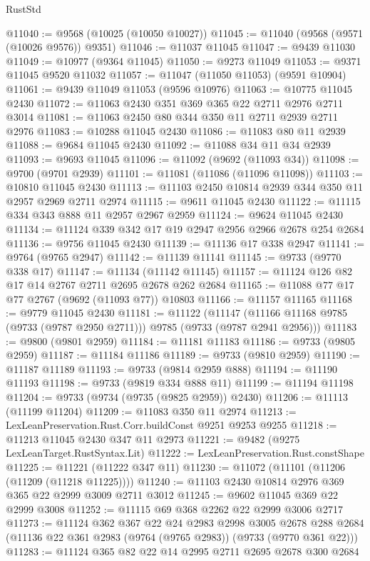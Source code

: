 \begin{lexlean}{RustStd}
\begin{coremodule}
{\begin{coremodule}
{{{{{{{{{{{{{{{{{{{{{{{{{{{{{{{{{{{{{{{{{{{{{{{{{{{{{{{@11040 := @9568 (@10025 (@10050 @10027))
@11045 := @11040 (@9568 (@9571 (@10026 @9576)) @9351)
@11046 := @11037 @11045
@11047 := @9439 @11030
@11049 := @10977 (@9364 @11045)
@11050 := @9273 @11049
@11053 := @9371 @11045 @9520 @11032
@11057 := @11047 (@11050 @11053) (@9591 @10904)
@11061 := @9439 @11049 @11053 (@9596 @10976)
@11063 := @10775 @11045 @2430
@11072 := @11063 @2430 @351 @369 @365 @22 @2711 @2976 @2711 @3014
@11081 := @11063 @2450 @80 @344 @350 @11 @2711 @2939 @2711 @2976
@11083 := @10288 @11045 @2430
@11086 := @11083 @80 @11 @2939
@11088 := @9684 @11045 @2430
@11092 := @11088 @34 @11 @34 @2939
@11093 := @9693 @11045
@11096 := @11092 (@9692 (@11093 @34))
@11098 := @9700 (@9701 @2939)
@11101 := @11081 (@11086 (@11096 @11098))
@11103 := @10810 @11045 @2430
@11113 := @11103 @2450 @10814 @2939 @344 @350 @11 @2957 @2969 @2711 @2974
@11115 := @9611 @11045 @2430
@11122 := @11115 @334 @343 @888 @11 @2957 @2967 @2959
@11124 := @9624 @11045 @2430
@11134 := @11124 @339 @342 @17 @19 @2947 @2956 @2966 @2678 @254 @2684
@11136 := @9756 @11045 @2430
@11139 := @11136 @17 @338 @2947
@11141 := @9764 (@9765 @2947)
@11142 := @11139 @11141
@11145 := @9733 (@9770 @338 @17)
@11147 := @11134 (@11142 @11145)
@11157 := @11124 @126 @82 @17 @14 @2767 @2711 @2695 @2678 @262 @2684
@11165 := @11088 @77 @17 @77 @2767 (@9692 (@11093 @77)) @10803
@11166 := @11157 @11165
@11168 := @9779 @11045 @2430
@11181 := @11122
    (@11147 (@11166 @11168 @9785 (@9733 (@9787 @2950 @2711))) @9785 (@9733 (@9787 @2941 @2956)))
@11183 := @9800 (@9801 @2959)
@11184 := @11181 @11183
@11186 := @9733 (@9805 @2959)
@11187 := @11184 @11186
@11189 := @9733 (@9810 @2959)
@11190 := @11187 @11189
@11193 := @9733 (@9814 @2959 @888)
@11194 := @11190 @11193
@11198 := @9733 (@9819 @334 @888 @11)
@11199 := @11194 @11198
@11204 := @9733 (@9734 (@9735 (@9825 @2959)) @2430)
@11206 := @11113 (@11199 @11204)
@11209 := @11083 @350 @11 @2974
@11213 := LexLeanPreservation.Rust.Corr.buildConst @9251 @9253 @9255
@11218 := @11213 @11045 @2430 @347 @11 @2973
@11221 := @9482 (@9275 LexLeanTarget.RustSyntax.Lit)
@11222 := LexLeanPreservation.Rust.constShape
@11225 := @11221 (@11222 @347 @11)
@11230 := @11072 (@11101 (@11206 (@11209 (@11218 @11225))))
@11240 := @11103 @2430 @10814 @2976 @369 @365 @22 @2999 @3009 @2711 @3012
@11245 := @9602 @11045 @369 @22 @2999 @3008
@11252 := @11115 @69 @368 @2262 @22 @2999 @3006 @2717
@11273 := @11124
    @362
    @367
    @22
    @24
    @2983
    @2998
    @3005
    @2678
    @288
    @2684
    (@11136 @22 @361 @2983 (@9764 (@9765 @2983)) (@9733 (@9770 @361 @22)))
@11283 := @11124 @365 @82 @22 @14 @2995 @2711 @2695 @2678 @300 @2684
}}}}}}}}}}}}}}}}}}}}}}}}}}}}}}}}}}}}}}}}}}}}}}}}}}}}}}}
\end{coremodule}}
\end{coremodule}
\end{lexlean}
